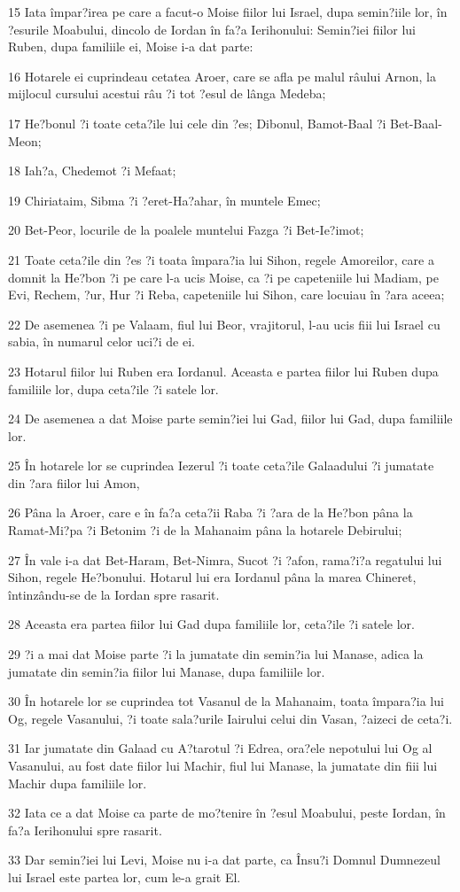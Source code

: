 \par 15 Iata împar?irea pe care a facut-o Moise fiilor lui Israel, dupa semin?iile lor, în ?esurile Moabului, dincolo de Iordan în fa?a Ierihonului: Semin?iei fiilor lui Ruben, dupa familiile ei, Moise i-a dat parte:
\par 16 Hotarele ei cuprindeau cetatea Aroer, care se afla pe malul râului Arnon, la mijlocul cursului acestui râu ?i tot ?esul de lânga Medeba;
\par 17 He?bonul ?i toate ceta?ile lui cele din ?es; Dibonul, Bamot-Baal ?i Bet-Baal-Meon;
\par 18 Iah?a, Chedemot ?i Mefaat;
\par 19 Chiriataim, Sibma ?i ?eret-Ha?ahar, în muntele Emec;
\par 20 Bet-Peor, locurile de la poalele muntelui Fazga ?i Bet-Ie?imot;
\par 21 Toate ceta?ile din ?es ?i toata împara?ia lui Sihon, regele Amoreilor, care a domnit la He?bon ?i pe care l-a ucis Moise, ca ?i pe capeteniile lui Madiam, pe Evi, Rechem, ?ur, Hur ?i Reba, capeteniile lui Sihon, care locuiau în ?ara aceea;
\par 22 De asemenea ?i pe Valaam, fiul lui Beor, vrajitorul, l-au ucis fiii lui Israel cu sabia, în numarul celor uci?i de ei.
\par 23 Hotarul fiilor lui Ruben era Iordanul. Aceasta e partea fiilor lui Ruben dupa familiile lor, dupa ceta?ile ?i satele lor.
\par 24 De asemenea a dat Moise parte semin?iei lui Gad, fiilor lui Gad, dupa familiile lor.
\par 25 În hotarele lor se cuprindea Iezerul ?i toate ceta?ile Galaadului ?i jumatate din ?ara fiilor lui Amon,
\par 26 Pâna la Aroer, care e în fa?a ceta?ii Raba ?i ?ara de la He?bon pâna la Ramat-Mi?pa ?i Betonim ?i de la Mahanaim pâna la hotarele Debirului;
\par 27 În vale i-a dat Bet-Haram, Bet-Nimra, Sucot ?i ?afon, rama?i?a regatului lui Sihon, regele He?bonului. Hotarul lui era Iordanul pâna la marea Chineret, întinzându-se de la Iordan spre rasarit.
\par 28 Aceasta era partea fiilor lui Gad dupa familiile lor, ceta?ile ?i satele lor.
\par 29 ?i a mai dat Moise parte ?i la jumatate din semin?ia lui Manase, adica la jumatate din semin?ia fiilor lui Manase, dupa familiile lor.
\par 30 În hotarele lor se cuprindea tot Vasanul de la Mahanaim, toata împara?ia lui Og, regele Vasanului, ?i toate sala?urile Iairului celui din Vasan, ?aizeci de ceta?i.
\par 31 Iar jumatate din Galaad cu A?tarotul ?i Edrea, ora?ele nepotului lui Og al Vasanului, au fost date fiilor lui Machir, fiul lui Manase, la jumatate din fiii lui Machir dupa familiile lor.
\par 32 Iata ce a dat Moise ca parte de mo?tenire în ?esul Moabului, peste Iordan, în fa?a Ierihonului spre rasarit.
\par 33 Dar semin?iei lui Levi, Moise nu i-a dat parte, ca Însu?i Domnul Dumnezeul lui Israel este partea lor, cum le-a grait El.

